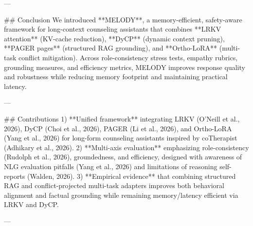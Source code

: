 ---

## Conclusion  
We introduced **MELODY**, a memory-efficient, safety-aware framework for long-context counseling assistants that combines **LRKV attention** (KV-cache reduction), **DyCP** (dynamic context pruning), **PAGER pages** (structured RAG grounding), and **Ortho-LoRA** (multi-task conflict mitigation). Across role-consistency stress tests, empathy rubrics, grounding measures, and efficiency metrics, MELODY improves response quality and robustness while reducing memory footprint and maintaining practical latency.

---

## Contributions  
1) **Unified framework** integrating LRKV (O’Neill et al., 2026), DyCP (Choi et al., 2026), PAGER (Li et al., 2026), and Ortho-LoRA (Yang et al., 2026) for long-form counseling assistants inspired by coTherapist (Adhikary et al., 2026).  
2) **Multi-axis evaluation** emphasizing role-consistency (Rudolph et al., 2026), groundedness, and efficiency, designed with awareness of NLG evaluation pitfalls (Yang et al., 2026) and limitations of reasoning self-reports (Walden, 2026).  
3) **Empirical evidence** that combining structured RAG and conflict-projected multi-task adapters improves both behavioral alignment and factual grounding while remaining memory/latency efficient via LRKV and DyCP.

---